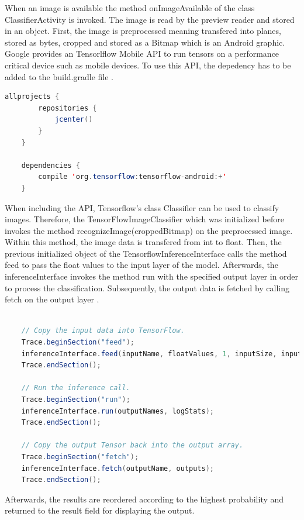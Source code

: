 When an image is available the method onImageAvailable of the class ClassifierActivity is invoked. The image is read by the preview reader and stored in an object. First, the image is preprocessed meaning transfered into planes, stored as bytes, cropped and stored as a Bitmap which is an Android graphic. Google provides an Tensorlflow Mobile API to run tensors on a performance critical device such as mobile devices. To use this API, the depedency has to be added to the build.gradle file . 

\begin{lstlisting}[caption=Tensorflow API in build.gradle, label=list:tensorflow_api, language=java]
	allprojects {
  		repositories {
        	jcenter()
    	}
	}

	dependencies {
    	compile 'org.tensorflow:tensorflow-android:+'
	}
\end{lstlisting}

When including the API, Tensorflow's class Classifier can be used to classify images. Therefore, the TensorFlowImageClassifier which was initialized before invokes the method recognizeImage(croppedBitmap) on the preprocessed image. Within this method, the image data is transfered from int to float. Then, the previous initialized object of the TensorflowInferenceInterface calls the method feed to pass the float values to the input layer of the model. Afterwards, the inferenceInterface invokes the method run with the specified output layer in order to process the classification. Subsequently, the output data is fetched by calling fetch on the output layer .

\begin{lstlisting}[caption=Classifying images by the inferenceInterface, label=list:classify_android, language=java]

    // Copy the input data into TensorFlow.
    Trace.beginSection("feed");
    inferenceInterface.feed(inputName, floatValues, 1, inputSize, inputSize, 3);
    Trace.endSection();

    // Run the inference call.
    Trace.beginSection("run");
    inferenceInterface.run(outputNames, logStats);
    Trace.endSection();

    // Copy the output Tensor back into the output array.
    Trace.beginSection("fetch");
    inferenceInterface.fetch(outputName, outputs);
    Trace.endSection();
\end{lstlisting}

Afterwards, the results are reordered according to the highest probability and returned to the result field for displaying the output.

